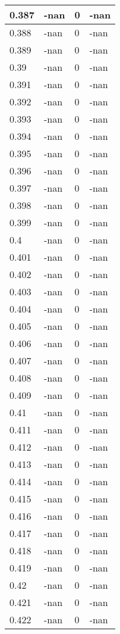 \documentclass[a4paper,14pt]{extarticle}
\begin{document}
\begin{longtable}{||m{3cm}||m{3cm}|m{3cm}||m{3cm}||}
\hline
0.387 & -nan & 0 & -nan\\
\hline
0.388 & -nan & 0 & -nan\\
\hline
0.389 & -nan & 0 & -nan\\
\hline
0.39 & -nan & 0 & -nan\\
\hline
0.391 & -nan & 0 & -nan\\
\hline
0.392 & -nan & 0 & -nan\\
\hline
0.393 & -nan & 0 & -nan\\
\hline
0.394 & -nan & 0 & -nan\\
\hline
0.395 & -nan & 0 & -nan\\
\hline
0.396 & -nan & 0 & -nan\\
\hline
0.397 & -nan & 0 & -nan\\
\hline
0.398 & -nan & 0 & -nan\\
\hline
0.399 & -nan & 0 & -nan\\
\hline
0.4 & -nan & 0 & -nan\\
\hline
0.401 & -nan & 0 & -nan\\
\hline
0.402 & -nan & 0 & -nan\\
\hline
0.403 & -nan & 0 & -nan\\
\hline
0.404 & -nan & 0 & -nan\\
\hline
0.405 & -nan & 0 & -nan\\
\hline
0.406 & -nan & 0 & -nan\\
\hline
0.407 & -nan & 0 & -nan\\
\hline
0.408 & -nan & 0 & -nan\\
\hline
0.409 & -nan & 0 & -nan\\
\hline
0.41 & -nan & 0 & -nan\\
\hline
0.411 & -nan & 0 & -nan\\
\hline
0.412 & -nan & 0 & -nan\\
\hline
0.413 & -nan & 0 & -nan\\
\hline
0.414 & -nan & 0 & -nan\\
\hline
0.415 & -nan & 0 & -nan\\
\hline
0.416 & -nan & 0 & -nan\\
\hline
0.417 & -nan & 0 & -nan\\
\hline
0.418 & -nan & 0 & -nan\\
\hline
0.419 & -nan & 0 & -nan\\
\hline
0.42 & -nan & 0 & -nan\\
\hline
0.421 & -nan & 0 & -nan\\
\hline
0.422 & -nan & 0 & -nan\\

\end{longtable}
\end{document}
